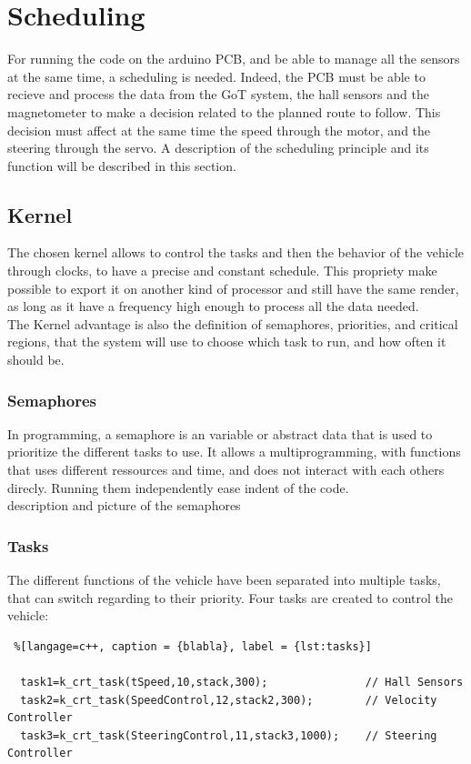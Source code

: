 \section{Scheduling}
For running the code on the arduino PCB, and be able to manage all the sensors at the same time, a scheduling is needed. Indeed, the PCB must be able to recieve and process the data from the GoT system, the hall sensors and the magnetometer to make a decision related to the planned route to follow. This decision must affect at the same time the speed through the motor, and the steering through the servo.
A description of the scheduling principle and its function will be described in this section.


\subsection{Kernel}
The chosen kernel allows to control the tasks and then the behavior of the vehicle through clocks, to have a precise and constant schedule. This propriety make possible to export it on another kind of processor and still have the same render, as long as it have a frequency high enough to process all the data needed.\\
The Kernel advantage is also the definition of semaphores, priorities, and critical regions, that the system will use to choose which task to run, and how often it should be.


\subsubsection{Semaphores}
In programming, a semaphore is an variable or abstract data that is used to prioritize the different tasks to use. It allows a multiprogramming, with functions that uses different ressources and time, and does not interact with each others direcly. Running them independently ease indent of the code.
\\
description and picture of the semaphores

\subsubsection{Tasks}
The different functions of the vehicle have been separated into multiple tasks, that can switch regarding to their priority. Four tasks are created to control the vehicle:

\begin{lstlisting} %[langage=c++, caption = {blabla}, label = {lst:tasks}]

  task1=k_crt_task(tSpeed,10,stack,300);               // Hall Sensors
  task2=k_crt_task(SpeedControl,12,stack2,300);        // Velocity Controller
  task3=k_crt_task(SteeringControl,11,stack3,1000);    // Steering Controller

\end{lstlisting}

